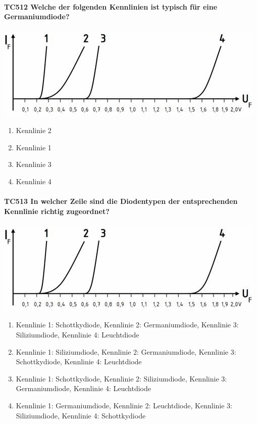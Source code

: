 \documentclass[8pt]{article}
\begin{document}
\begin{enumerate}
\begin{enumerate}[nolistsep,label=\Alph*]
{\paragraph*{TC512 Welche der folgenden Kennlinien ist typisch für eine Germaniumdiode?}
\begin{center}
	\begin{minipage}{\linewidth}
		\centering
		\includegraphics[scale=1.0]{pics/tc512_a.jpg}
	\end{minipage}
\end{center}
\begin{enumerate}[nolistsep,label=\Alph*]
\item Kennlinie 2
\item Kennlinie 1
\item Kennlinie 3
\item Kennlinie 4
\end{enumerate}

\paragraph*{TC513 In welcher Zeile sind die Diodentypen der entsprechenden Kennlinie richtig zugeordnet?}
\begin{center}
	\begin{minipage}{\linewidth}
		\centering
		\includegraphics[scale=1.0]{pics/tc513_a.jpg}
	\end{minipage}
\end{center}
\begin{enumerate}[nolistsep,label=\Alph*]
\item Kennlinie 1: Schottkydiode, Kennlinie 2: Germaniumdiode, Kennlinie 3: Siliziumdiode, Kennlinie 4: Leuchtdiode
\item Kennlinie 1: Siliziumdiode, Kennlinie 2: Germaniumdiode, Kennlinie 3: Schottkydiode, Kennlinie 4: Leuchtdiode
\item Kennlinie 1: Schottkydiode, Kennlinie 2: Siliziumdiode, Kennlinie 3: Germaniumdiode, Kennlinie 4: Leuchtdiode
\item Kennlinie 1: Germaniumdiode, Kennlinie 2: Leuchtdiode, Kennlinie 3: Siliziumdiode, Kennlinie 4: Schottkydiode


\end{enumerate}}
\end{enumerate}
\end{enumerate}
\end{document}

